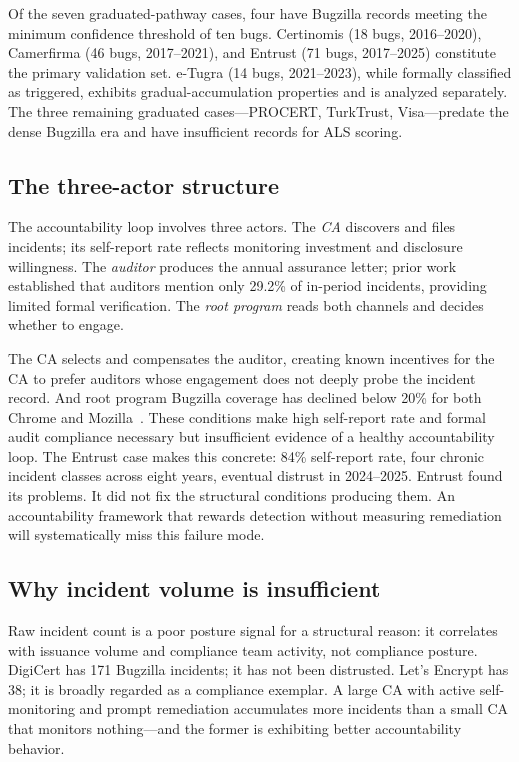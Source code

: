 \documentclass[10pt,twocolumn,letterpaper]{article}
\begin{document}
Of the seven graduated-pathway cases, four have Bugzilla records meeting the minimum
confidence threshold of ten bugs. Certinomis (18 bugs, 2016--2020), Camerfirma (46 bugs,
2017--2021), and Entrust (71 bugs, 2017--2025) constitute the primary validation set.
e-Tugra (14 bugs, 2021--2023), while formally classified as triggered, exhibits
gradual-accumulation properties and is analyzed separately. The three remaining graduated
cases---PROCERT, TurkTrust, Visa---predate the dense Bugzilla era and have insufficient
records for ALS scoring.

\subsection{The three-actor structure}

The accountability loop involves three actors. The \textit{CA} discovers and files
incidents; its self-report rate reflects monitoring investment and disclosure willingness.
The \textit{auditor} produces the annual assurance letter; prior work~\cite{p1} established
that auditors mention only 29.2\% of in-period incidents, providing limited formal
verification. The \textit{root program} reads both channels and decides whether to engage.

The CA selects and compensates the auditor, creating known incentives for the CA to
prefer auditors whose engagement does not deeply probe the incident record. And root
program Bugzilla coverage has declined below 20\% for both Chrome and Mozilla~\cite{p2}.
These conditions make high self-report rate and formal audit compliance necessary but
insufficient evidence of a healthy accountability loop. The Entrust case makes this
concrete: 84\% self-report rate, four chronic incident classes across eight years, eventual
distrust in 2024--2025. Entrust found its problems. It did not fix the structural
conditions producing them. An accountability framework that rewards detection without
measuring remediation will systematically miss this failure mode.

\subsection{Why incident volume is insufficient}

Raw incident count is a poor posture signal for a structural reason: it correlates with
issuance volume and compliance team activity, not compliance posture. DigiCert has 171
Bugzilla incidents; it has not been distrusted. Let's Encrypt has 38; it is broadly
regarded as a compliance exemplar. A large CA with active self-monitoring and prompt
remediation accumulates more incidents than a small CA that monitors nothing---and the
former is exhibiting better accountability behavior.
\end{document}
